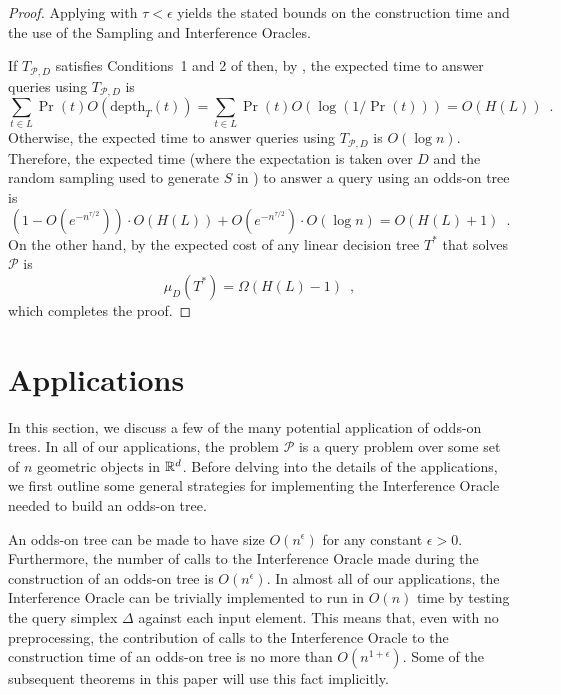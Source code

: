 \documentclass{patmorin}
\newcommand{\depth}{\mathrm{depth}}
\begin{document}
\begin{proof}
  Applying  with $\tau < \epsilon$
  yields the stated bounds on the construction time and the use of the
  Sampling and Interference Oracles.

  If $T_{\mathcal{P},D}$ satisfies Conditions~1 and 2 of
   then, by , the expected
  time to answer queries using $T_{\mathcal{P},D}$ is
  \[
     \sum_{t\in L} \Pr(t)O(\depth_T(t)) 
          = \sum_{t\in L}\Pr(t)O(\log(1/\Pr(t))) = O(H(L)) \enspace .
  \]
  Otherwise, the expected time to answer queries using $T_{\mathcal{P},D}$
  is $O(\log n)$.  Therefore, the expected time (where the expectation
  is taken over $D$ and the random sampling used to generate $S$ in
  ) to answer a query using an odds-on tree is
  \[
     (1-O(e^{-n^{\tau/2}}))\cdot O(H(L)) + O(e^{-n^{\tau/2}})\cdot O(\log n) =
        O(H(L)+1)  \enspace .
  \]
  On the other hand, by  the expected cost of any
  linear decision tree $T^*$ that solves $\mathcal{P}$ is
  \[
      \mu_D(T^*) = \Omega(H(L) - 1) \enspace ,
  \]
  which completes the proof.
\end{proof}

\section{Applications}

In this section, we discuss a few of the many potential application of
odds-on trees.  In all of our applications, the problem $\mathcal{P}$
is a query problem over some set of $n$ geometric objects in $\mathbb{R}^d$.
Before delving into the details of the applications, we first outline
some general strategies for implementing the Interference Oracle needed
to build an odds-on tree.

An odds-on tree can be made to have size $O(n^\epsilon)$ for any
constant $\epsilon > 0$.  Furthermore, the number of calls to the
Interference Oracle made during the construction of an odds-on tree is
$O(n^\epsilon)$.  In almost all of our applications, the Interference
Oracle can be trivially implemented to run in $O(n)$ time by testing
the query simplex $\Delta$ against each input element.  This means
that, even with no preprocessing, the contribution of calls to the
Interference Oracle to the construction time of an odds-on tree is no more
than $O(n^{1+\epsilon})$.  Some of the subsequent theorems in this paper
will use this fact implicitly.
\end{document}
